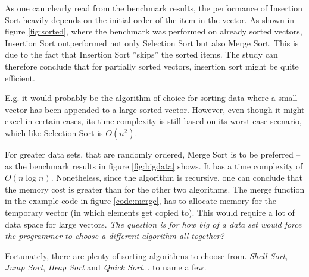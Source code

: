\documentclass[a4paper, 11pt]{article}
\begin{document}
    As one can clearly read from the benchmark results, the performance of 
    Insertion Sort heavily depends on the initial order of the item in the vector.
    As shown in figure \ref{fig:sorted}, where the benchmark was performed on already 
    sorted vectors, Insertion Sort outperformed not only 
    Selection Sort but also Merge Sort. This is due to the fact that Insertion Sort
    ''skips'' the sorted items. The study can therefore conclude that for partially 
    sorted vectors, insertion sort might be quite efficient. 
    
    E.g. it would 
    probably be the algorithm of choice for sorting data where a small vector
    has been appended to a large sorted vector. However, even though it might excel 
    in certain cases, its time complexity is still based on its worst case scenario, 
    which like Selection Sort is $O(n^2)$.

    For greater data sets, that are randomly ordered, 
    Merge Sort is to be preferred -- as the benchmark results 
    in figure \ref{fig:bigdata} shows. 
    It has a time complexity of $O(n\log n)$. 
    Nonetheless, since the algorithm is recursive, one
    can conclude that the memory cost is greater than for the other two algorithms. 
    The merge function in the example code in figure \ref{code:merge}, 
    has to allocate memory for the temporary vector (in which elements get copied to).
    This would require a lot of data space for large vectors. \emph{The question is 
    for how big of a data set would force the programmer to choose a 
    different algorithm all together?}

    Fortunately, there are plenty of sorting algorithms to choose from. \emph{Shell Sort}, 
    \emph{Jump Sort}, \emph{Heap Sort} and \emph{Quick Sort}... to name a few.  


    
\end{document}
